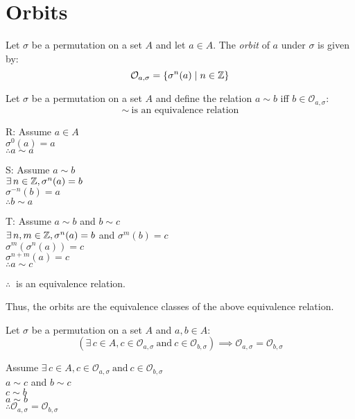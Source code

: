 \documentclass[letterpaper,12pt,fleqn]{article}
\renewcommand{\o}{\sigma}
\renewcommand{\O}{\mathcal{O}}
\newcommand{\orb}[2]{\O_{#1,#2}}
\newcommand{\oorb}[1]{\orb{#1}{\o}}
\begin{document}
\section*{Orbits}

\begin{definition}
  Let $\o$ be a permutation on a set $A$ and let $a\in A$. The \emph{orbit} of
  $a$ under $\o$ is given by:
  \[\oorb{a}=\{\o^n(a)\mid n\in\Z\}\]
\end{definition}

\begin{theorem}
  Let $\o$ be a permutation on a set $A$ and define the relation $a\sim b$ iff
  $b\in\oorb{a}$:
  \[\sim\ \mbox{is an equivalence relation}\]
\end{theorem}

\begin{theproof}
  \listbreak
  \begin{description}
  \item{R}: Assume $a\in A$ \\
    $\o^0(a)=a$ \\
    $\therefore a\sim a$
  \item{S}: Assume $a\sim b$ \\
    $\exists\,n\in\Z,\o^n(a)=b$ \\
    $\o^{-n}(b)=a$ \\
    $\therefore b\sim a$
  \item{T}: Assume $a\sim b$ and $b\sim c$ \\
    $\exists\,n,m\in\Z,\o^n(a)=b$ and $\o^m(b)=c$ \\
    $\o^m(\o^n(a))=c$ \\
    $\o^{n+m}(a)=c$ \\
    $\therefore a\sim c$
  \end{description}
  $\therefore ~$ is an equivalence relation.
\end{theproof}

Thus, the orbits are the equivalence classes of the above equivalence relation.

\begin{corollary}
  Let $\o$ be a permutation on a set $A$ and $a,b\in A$:
  \[\left(\exists\,c\in A,c\in\oorb{a}\ \mbox{and}\ c\in\oorb{b}\right)\implies
  \oorb{a}=\oorb{b}\]
\end{corollary}

\begin{theproof}
  Assume $\exists\,c\in A,c\in\oorb{a}\ \mbox{and}\ c\in\oorb{b}$ \\
  $a\sim c$ and $b\sim c$ \\
  $c\sim b$ \\
  $a\sim b$ \\
  $\therefore \oorb{a}=\oorb{b}$
\end{theproof}
\end{document}
